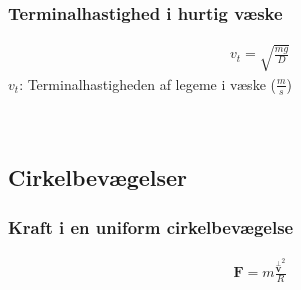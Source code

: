 	\subsubsection{Terminalhastighed i hurtig væske}
		\begin{align}
			v_t=\sqrt{\frac{mg}{D}}
		\end{align}
		$v_t$: Terminalhastigheden af legeme i væske ($\frac{m}{s}$)\\
		\hurtveskfriktion\\
		\masse\\
		\tyngde

\subsection{Cirkelbevægelser}
	\subsubsection{Kraft i en uniform cirkelbevægelse}
		\begin{align}
			\mathbf{F}=m\frac{\stackrel{\bot}{\mathbf{v}}^2}{R}
		\end{align}
		\Kraft\\
		\masse\\
		\Vel\\
		\radcircvej